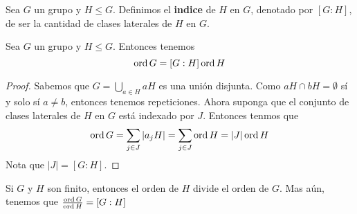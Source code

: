 \begin{definition}
    Sea $G$ un grupo y  $H \leq G$. Definimos el \textbf{indice} de $H$ en  $G$,
    denotado por  $[G:H]$, de ser la cantidad de clases laterales de $H$ en
    $G$.
\end{definition}

\begin{theorem}\label{thm_3.7}
    Sea $G$ un grupo y  $H \leq G$. Entonces tenemos
    \begin{equation*}
        \operatorname{ord}{G}=[G:H]\operatorname{ord}{H}
    \end{equation*}
\end{theorem}
\begin{proof}
    Sabemos que $G=\bigcup_{a \in H}{aH}$ es una uni\'on disjunta. Como $aH \cap
    bH=\emptyset$ s\'i y solo s\'i  $a \neq b$, entonces tenemos repeticiones.
    Ahora suponga que el conjunto de clases laterales de $H$ en $G$ est\'a
    indexado por $J$. Entonces tenmos que
    \begin{equation*}
        \operatorname{ord}{G}=\sum_{j \in J}{|a_jH|}=\sum_{j \in J}{\operatorname{ord}{H}}=|J|\operatorname{ord}{H}
    \end{equation*}
    Nota que $|J|=[G:H]$.
\end{proof}
\begin{corollary}
    Si $G$ y  $H$ son finito, entonces el orden de $H$ divide el orden de $G$.
    Mas a\'un, tenemos que
    $\frac{\operatorname{ord}{G}}{\operatorname{ord}{H}}=[G:H]$
\end{corollary}
